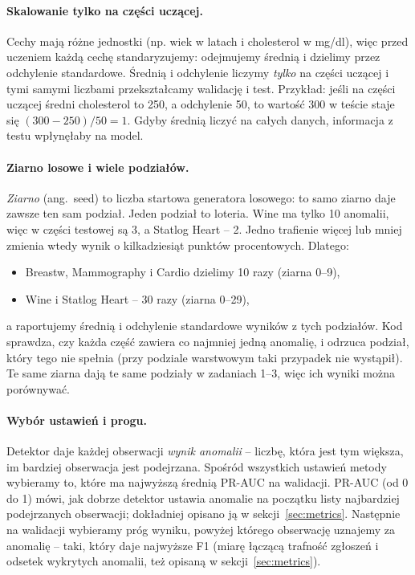 \documentclass[11pt,a4paper]{article}
\begin{document}
\paragraph{Skalowanie tylko na części uczącej.} Cechy mają różne jednostki
(np. wiek w latach i cholesterol w mg/dl), więc przed uczeniem każdą cechę
standaryzujemy: odejmujemy średnią i dzielimy przez odchylenie standardowe.
Średnią i odchylenie liczymy \emph{tylko} na części uczącej i tymi samymi
liczbami przekształcamy walidację i test. Przykład: jeśli na części uczącej
średni cholesterol to 250, a odchylenie 50, to wartość 300 w teście staje się
$(300-250)/50=1$. Gdyby średnią liczyć na całych danych, informacja z testu
wpłynęłaby na model.

\paragraph{Ziarno losowe i wiele podziałów.} \emph{Ziarno} (ang.~seed) to
liczba startowa generatora losowego: to samo ziarno daje zawsze ten sam
podział. Jeden podział to loteria. Wine ma tylko 10 anomalii, więc
w części testowej są 3, a Statlog Heart -- 2. Jedno trafienie więcej lub
mniej zmienia wtedy wynik o kilkadziesiąt punktów procentowych. Dlatego:
\begin{itemize}
  \item Breastw, Mammography i Cardio dzielimy 10 razy (ziarna 0--9),
  \item Wine i Statlog Heart -- 30 razy (ziarna 0--29),
\end{itemize}
a raportujemy średnią i odchylenie standardowe wyników z tych podziałów.
Kod sprawdza, czy każda część zawiera co najmniej jedną anomalię, i odrzuca
podział, który tego nie spełnia (przy podziale warstwowym taki przypadek
nie wystąpił). Te same ziarna dają te same podziały w zadaniach 1--3, więc
ich wyniki można porównywać.

\paragraph{Wybór ustawień i progu.} Detektor daje każdej obserwacji
\emph{wynik anomalii} -- liczbę, która jest tym większa, im bardziej obserwacja
jest podejrzana. Spośród wszystkich ustawień metody wybieramy to, które ma
najwyższą średnią PR-AUC na walidacji. PR-AUC (od 0 do 1) mówi, jak dobrze
detektor ustawia anomalie na początku listy najbardziej podejrzanych
obserwacji; dokładniej opisano ją w sekcji~\ref{sec:metrics}. Następnie na
walidacji wybieramy próg wyniku, powyżej którego obserwację uznajemy za
anomalię -- taki, który daje najwyższe F1 (miarę łączącą trafność zgłoszeń
i odsetek wykrytych anomalii, też opisaną w sekcji~\ref{sec:metrics}).
\end{document}
